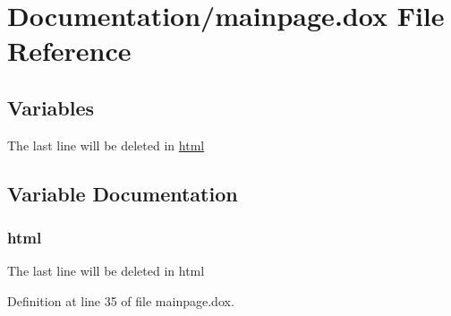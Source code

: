 \hypertarget{mainpage_8dox}{}\section{Documentation/mainpage.dox File Reference}
\label{mainpage_8dox}
\subsection*{Variables}
\begin{DoxyCompactItemize}
\item 
The last line will be deleted in \hyperlink{mainpage_8dox_aaf86f0bda38d4b6b25c425bac952ff9d}{html}
\end{DoxyCompactItemize}


\subsection{Variable Documentation}
\mbox{\label{mainpage_8dox_aaf86f0bda38d4b6b25c425bac952ff9d}} 
\subsubsection{\texorpdfstring{html}{html}}
{\footnotesize\ttfamily The last line will be deleted in html}



Definition at line 35 of file mainpage.\+dox.

